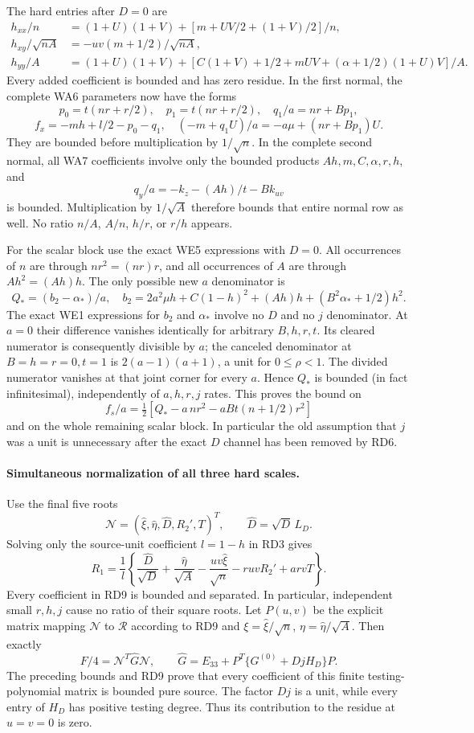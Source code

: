 The hard entries after $D=0$ are
\begin{align*}
 h_{xx}/n&=(1+U)(1+V)+[m+UV/2+(1+V)/2]/n,\\
 h_{xy}/\sqrt{nA}&=-uv(m+1/2)/\sqrt{nA},\\
 h_{yy}/A&=(1+U)(1+V)
       +[C(1+V)+1/2+mUV+(\alpha+1/2)(1+U)V]/A.
\end{align*}
Every added coefficient is bounded and has zero residue.
In the first normal, the complete WA6 parameters now have the forms
\[
 p_0=t(nr+r/2),\quad p_1=t(nr+r/2),\quad
 q_1/a=nr+Bp_1,
\]
\[
 f_x=-mh+l/2-p_0-q_1,
 \quad (-m+q_1U)/a=-a\mu+(nr+Bp_1)U.
\]
They are bounded before multiplication by $1/\sqrt n$.
In the complete second normal, all WA7 coefficients involve only
the bounded products $Ah,m,C,\alpha,r,h$, and
\[
 q_y/a=-k_z-(Ah)/t-Bk_{uv}
\]
is bounded. Multiplication by $1/\sqrt A$ therefore bounds that
entire normal row as well. No ratio $n/A$, $A/n$, $h/r$, or $r/h$
appears.

For the scalar block use the exact WE5 expressions with $D=0$.
All occurrences of $n$ are through $nr^2=(nr)r$, and all occurrences
of $A$ are through $Ah^2=(Ah)h$. The only possible new $a$ denominator
is
\[
 Q_*=(b_2-\alpha_*)/a,\quad
 b_2=2a^2\mu h+C(1-h)^2+(Ah)h+(B^2\alpha_*+1/2)h^2. \tag{RD7}
\]
The exact WE1 expressions for $b_2$ and $\alpha_*$ involve no $D$
and no $j$ denominator. At $a=0$ their difference vanishes identically
for arbitrary $B,h,r,t$. Its cleared numerator is consequently
divisible by $a$; the canceled denominator at $B=h=r=0,t=1$ is
$2(a-1)(a+1)$, a unit for $0\le\rho<1$. The divided numerator
vanishes at that joint corner for every $a$. Hence $Q_*$ is bounded
(in fact infinitesimal), independently of $a,h,r,j$ rates.
This proves the bound on
\[
 f_s/a=\tfrac12[Q_*-a\,nr^2-aBt(n+1/2)r^2]
\]
and on the whole remaining scalar block. In particular the old
assumption that $j$ was a unit is unnecessary after the exact $D$
channel has been removed by RD6.

\paragraph{Simultaneous normalization of all three hard scales.}
Use the final five roots
\[
 \mathcal N=(\widehat\xi,\widehat\eta,\widehat D,R_2',T)^T,
 \qquad\widehat D=\sqrt D\,L_D.                    \tag{RD8}
\]
Solving only the source-unit coefficient $l=1-h$ in RD3 gives
\[
 R_1=\frac1l\left\{
 \frac{\widehat D}{\sqrt D}
 +\frac{\widehat\eta}{\sqrt A}
 -\frac{uv\widehat\xi}{\sqrt n}
 -ruvR_2'+arvT\right\}.                            \tag{RD9}
\]
Every coefficient in RD9 is bounded and separated. In particular,
independent small $r,h,j$ cause no ratio of their square roots.
Let $P(u,v)$ be the explicit matrix mapping $\mathcal N$ to
$\mathcal R$ according to RD9 and
$\xi=\widehat\xi/\sqrt n$, $\eta=\widehat\eta/\sqrt A$.
Then exactly
\[
 F/4=\mathcal N^T\widehat G\mathcal N,
 \qquad
 \widehat G=E_{33}+P^T\{G^{(0)}+DjH_D\}P.          \tag{RD10}
\]
The preceding bounds and RD9 prove that every coefficient of this
finite testing-polynomial matrix is bounded pure source. The factor
$Dj$ is a unit, while every entry of $H_D$ has positive testing degree.
Thus its contribution to the residue at $u=v=0$ is zero.

